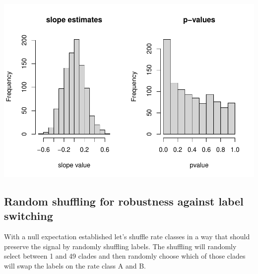 \documentclass[
]{article}
\begin{document}
\includegraphics{SX-regression-distribution_files/figure-latex/unnamed-chunk-7-1.pdf}

\hypertarget{random-shuffling-for-robustness-against-label-switching}{%
\subsection{Random shuffling for robustness against label
switching}\label{random-shuffling-for-robustness-against-label-switching}}

With a null expectation established let's shuffle rate classes in a way
that should preserve the signal by randomly shuffling labels. The
shuffling will randomly select between 1 and 49 clades and then randomly
choose which of those clades will swap the labels on the rate class A
and B.
\end{document}
